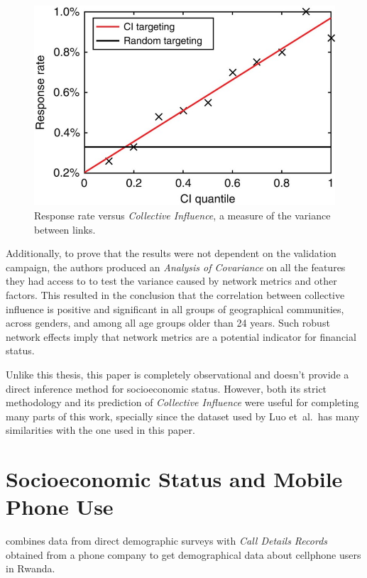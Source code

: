 \begin{figure}
\centering
\includegraphics[height=.25\textheight]{figures/luo2017results.png}
\caption{Response rate versus \emph{Collective Influence}, a measure of the variance between links.}
\label{fig:luo2017results}
\end{figure}

Additionally, to prove that the results were not dependent on the validation campaign, the authors produced an \emph{Analysis of Covariance}\cite{wildt1978analysis} on all the features they had access to to test the variance caused by network metrics and other factors.
This resulted in the conclusion that the correlation between collective influence is positive and significant in all groups of geographical communities, across genders, and among all age groups older than 24 years.
Such robust network effects imply that network metrics are a potential indicator for financial status.

Unlike this thesis, this paper is completely observational and doesn't provide a direct inference method for socioeconomic status. However, both its strict methodology and its prediction of \emph{Collective Influence} were useful for completing many parts of this work, specially since the dataset used by Luo et~al.\ has many similarities with the one used in this paper.


\section{Socioeconomic Status and Mobile Phone Use}

\cite{blumenstock2010mobile} combines data from direct demographic surveys with \emph{Call Details Records} obtained from a phone company to get demographical data about cellphone users in Rwanda.

